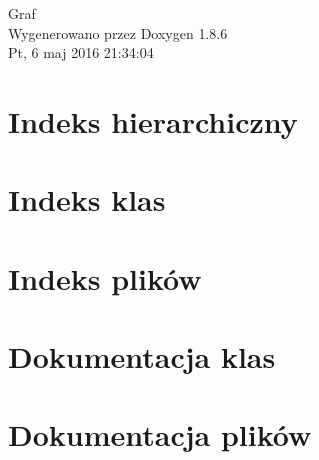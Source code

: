 \documentclass[twoside]{article}
\begin{document}
\hypersetup{pageanchor=false}
\begin{titlepage}
\vspace*{7cm}
\begin{center}%
{\Large Graf }\\
\vspace*{1cm}
{\large Wygenerowano przez Doxygen 1.8.6}\\
\vspace*{0.5cm}
{\small Pt, 6 maj 2016 21:34:04}\\
\end{center}
\end{titlepage}
\tableofcontents
{}
\hypersetup{pageanchor=true}

\section{Indeks hierarchiczny}

\section{Indeks klas}

\section{Indeks plików}

\section{Dokumentacja klas}














\section{Dokumentacja plików}



















\newpage
{}
{}
\printindex
\end{document}
